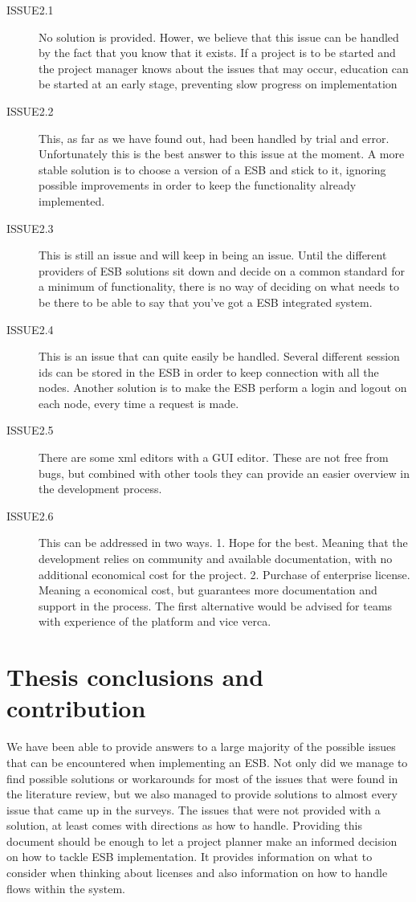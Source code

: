 \documentclass{llncs}
\begin{document}
\begin{description}
\begin{description}
\item[ISSUE2.1] No solution is provided. Hower, we believe that this issue can be handled by the fact that you know that it exists. If a project is to be started and the project manager knows about the issues that may occur, education can be started at an early stage, preventing slow progress on implementation
\item[ISSUE2.2] This, as far as we have found out, had been handled by trial and error. Unfortunately this is the best answer to this issue at the moment. A more stable solution is to choose a version of a ESB and stick to it, ignoring possible improvements in order to keep the functionality already implemented.
\item[ISSUE2.3] This is still an issue and will keep in being an issue. Until the different providers of ESB solutions sit down and decide on a common standard for a minimum of functionality, there is no way of deciding on what needs to be there to be able to say that you’ve got a ESB integrated system.
\item[ISSUE2.4] This is an issue that can quite easily be handled. Several different session ids can be stored in the ESB in order to keep connection with all the nodes. Another solution is to make the ESB perform a login and logout on each node, every time  a request is made.
\item[ISSUE2.5] There are some xml editors with a GUI editor. These are not free from bugs, but combined with other tools they can provide an easier overview in the development process.
\item[ISSUE2.6] This can be addressed in two ways. 1. Hope for the best. Meaning that the development relies on community and available documentation, with no additional economical cost for the project. 2. Purchase of enterprise license. Meaning a economical cost, but guarantees more documentation and support in the process. The first alternative would be advised for teams with experience of the platform and vice verca.
\end{description}

\end{description}

\section{Thesis conclusions and contribution}
We have been able to provide answers to a large majority of the possible issues that can be encountered when implementing an ESB. Not only did we manage to find possible solutions or workarounds for most of the issues that were found in the literature review, but we also managed to provide solutions to almost every issue that came up in the surveys.
The issues that were not provided with a solution, at least comes with directions as how to handle. Providing this document should be enough to let a project planner make an informed decision on how to tackle ESB implementation. It provides information on what to consider when thinking about licenses and also information on how to handle flows within the system.
\end{document}
